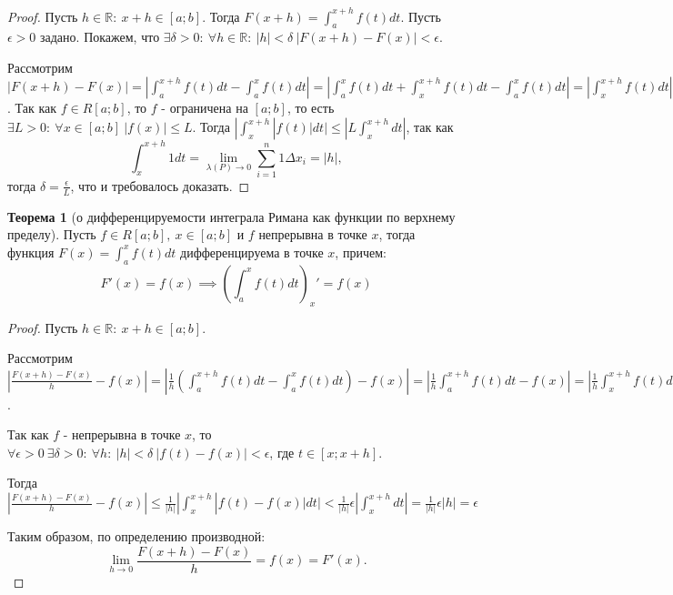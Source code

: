 \documentclass{report}
\theoremstyle{definition}
\newtheorem{theorem}{Теорема}[section]
\begin{document}
\begin{proof}
  Пусть $h\in \mathbb{R}: \ x + h \in [a;b]$. Тогда $F(x+h) = \int_{a}^{x+h}f(t)dt$. Пусть
  $\epsilon>0$ задано. Покажем, что $\exists\delta>0: \ \forall h \in \mathbb{R}: \ |h|<\delta \
    | F(x+h) - F(x) | < \epsilon$.

  Рассмотрим $| F(x+h) - F(x) | = | \int_{a}^{x+h}f(t)dt - \int_{a}^{x}f(t)dt | = | \int_{a}^{x}f(t)dt +
    \int_{x}^{x+h}f(t)dt - \int_{a}^{x}f(t)dt | = | \int_{x}^{x+h}f(t)dt | \leqslant |\int_{x}^{x+h}| f(t) |dt|$.
  Так как $f\in R[a;b]$, то $f$ - ограничена на $[a;b]$, то есть $\exists L > 0: \ \forall x \in [a;b] \
    | f(x) | \leqslant L$. Тогда $|\int_{x}^{x+h}| f(t) |dt| \leqslant | L \int_{x}^{x+h}dt |$, так как
  \begin{equation*}
    \int_{x}^{x+h}1dt = \underset{\lambda(P)\rightarrow0}{\lim}\sum_{i=1}^{n}1\Delta x_{i} = | h |,
  \end{equation*}
  тогда $\delta = \frac{\epsilon}{L}$, что и требовалось доказать.
\end{proof}

\begin{theorem}[о дифференцируемости интеграла Римана как функции по верхнему пределу]
  Пусть $f\in R[a;b], \ x \in [a;b]$ и $f$ непрерывна в точке $x$, тогда функция $F(x) = \int_{a}^{x}f(t)dt$
  дифференцируема в точке $x$, причем:
  \begin{equation*}
    F'(x) = f(x) \implies (\int_{a}^{x}f(t)dt)_{x}'=f(x)
  \end{equation*}
\end{theorem}

\begin{proof}
  Пусть $h\in\mathbb{R}: \ x+h \in [a;b]$.

  Рассмотрим $|\frac{F(x+h) - F(x)}{h} - f(x)| = | \frac{1}{h}(\int_{a}^{x+h}f(t)dt - \int_{a}^{x}f(t)dt) -
    f(x) | = | \frac{1}{h} \int_{a}^{x+h}f(t)dt - f(x) | = | \frac{1}{h}\int_{x}^{x+h}f(t)dt - \frac{f(x)}{h}
    \int_{x}^{x+h}dt | = | \frac{1}{h}(\int_{x}^{x+h}f(t)dt - \int_{x}^{x+h}f(x)dt) | = | \frac{1}{h}
    (\int_{x}^{x+h}(f(t)-f(x))dt) | = \frac{1}{|h|}| \int_{x}^{x+h}| f(t) - f(x) |dt |$.

    Так как $f$ - непрерывна в точке $x$, то $\forall \epsilon>0 \ \exists \delta>0: \ \forall h: \ |h|<\delta
    \ | f(t) - f(x) | < \epsilon$, где $t\in[x;x+h]$.

    Тогда $|\frac{F(x+h) - F(x)}{h} - f(x) | \leqslant \frac{1}{|h|}| \int_{x}^{x+h}| f(t) - f(x) |dt | <
    \frac{1}{|h|}\epsilon| \int_{x}^{x+h}dt | = \frac{1}{|h|}\epsilon|h| = \epsilon$

    Таким образом, по определению производной:
    \begin{equation*}
      \underset{h\rightarrow0}{\lim}\frac{F(x+h) - F(x)}{h} = f(x) = F'(x).
    \end{equation*}
\end{proof}
\end{document}
